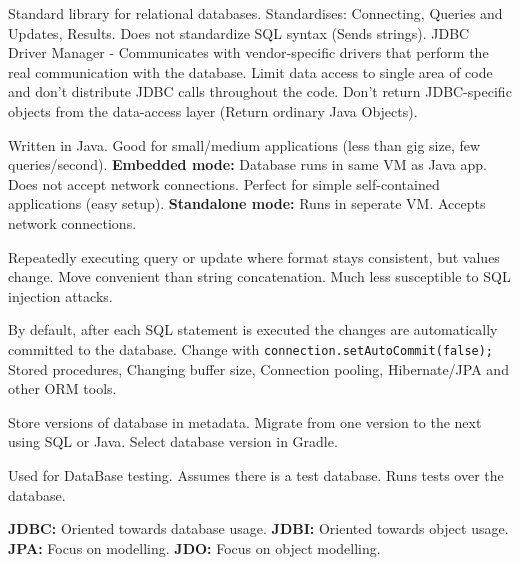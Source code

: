 \documentclass[number]{assignment}
\begin{document}
\begin{landscape}
\begin{multicols}{3}
\small Standard library for relational databases. Standardises: Connecting, Queries and Updates, Results. Does not standardize SQL syntax (Sends strings).
\small JDBC Driver Manager - Communicates with vendor-specific drivers that perform the real communication with the database.
\small Limit data access to single area of code and don't distribute JDBC calls throughout the code. Don't return JDBC-specific objects from the data-access layer (Return ordinary Java Objects).

\small Written in Java. Good for small/medium applications (less than gig size, few queries/second). \textbf{Embedded mode:} Database runs in same VM as Java app. Does not accept network connections. Perfect for simple self-contained applications (easy setup). \textbf{Standalone mode:} Runs in seperate VM. Accepts network connections.

\small Repeatedly executing query or update where format stays consistent, but values change.
\small Move convenient than string concatenation. Much less susceptible to SQL injection attacks.

\scriptsize By default, after each SQL statement is executed the changes are automatically committed to the database. Change with \texttt{connection.setAutoCommit(false);}
\scriptsize Stored procedures, Changing buffer size, Connection pooling, Hibernate/JPA and other ORM tools.

\small Store versions of database in metadata. Migrate from one version to the next using SQL or Java. Select database version in Gradle.

\small Used for DataBase testing. Assumes there is a test database. Runs tests over the database.



\small\textbf{JDBC:} Oriented towards database usage. \textbf{JDBI:} Oriented towards object usage. \textbf{JPA:} Focus on modelling. \textbf{JDO:} Focus on object modelling.

\end{multicols}
\end{landscape}
\end{document}

